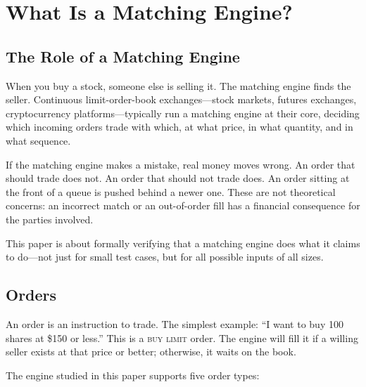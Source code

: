 \documentclass[11pt,a4paper]{article}
\begin{document}
\section{What Is a Matching Engine?}
\label{sec:intro}

\subsection{The Role of a Matching Engine}

When you buy a stock, someone else is selling it. The matching engine
finds the seller. Continuous limit-order-book exchanges---stock
markets, futures exchanges, cryptocurrency platforms---typically run a
matching engine at their core, deciding which incoming orders trade
with which, at what price, in what quantity, and in what sequence.

If the matching engine makes a mistake, real money moves wrong. An order
that should trade does not. An order that should not trade does. An
order sitting at the front of a queue is pushed behind a newer one.
These are not theoretical concerns: an incorrect match or an
out-of-order fill has a financial consequence for the parties involved.

This paper is about formally verifying that a matching engine does what
it claims to do---not just for small test cases, but for all possible
inputs of all sizes.

\subsection{Orders}
\label{sec:orders-intro}

An order is an instruction to trade. The simplest example: ``I want to
buy 100 shares at \$150 or less.'' This is a \textsc{buy limit} order.
The engine will fill it if a willing seller exists at that price or
better; otherwise, it waits on the book.

The engine studied in this paper supports five order types:
\end{document}
